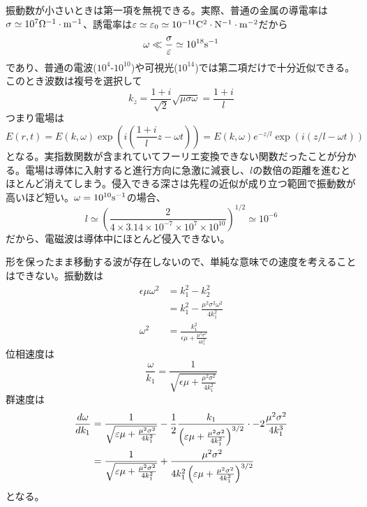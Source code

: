     振動数が小さいときは第一項を無視できる。実際、普通の金属の導電率は$\sigma \simeq 10^7 {\rm \Omega^{-1} \cdot m^{-1}}$、誘電率は$\epsilon \simeq \epsilon_0 \simeq 10^{-11}{\rm C^2 \cdot N^{-1} \cdot m^{-2}}$だから
        \[\omega \ll \frac{\sigma}{\epsilon} \simeq 10^{18}{\rm s^{-1}}\]
    であり、普通の電波($10^4$-$10^{10}$)や可視光($10^{14}$)では第二項だけで十分近似できる。このとき波数は複号を選択して
        \[k_z = \frac{1 + i}{\sqrt{2}}\sqrt{\mu\sigma\omega} = \frac{1 + i}{l}\]
    つまり電場は
        \[E(r, t) = E(k, \omega)\exp\left(i\left(\frac{1 + i}{l}z - \omega t\right)\right) = E(k, \omega)e^{-z/l}\exp(i(z/l - \omega t))\]
    となる。実指数関数が含まれていてフーリエ変換できない関数だったことが分かる。電場は導体に入射すると進行方向に急激に減衰し、$l$の数倍の距離を進むとほとんど消えてしまう。侵入できる深さは先程の近似が成り立つ範囲で振動数が高いほど短い。$\omega = 10^{10}{\rm s^{-1}}$の場合、
        \[l \simeq \left(\frac{2}{4\times 3.14\times 10^{-7}\times 10^7\times 10^{10}}\right)^{1/2} \simeq 10^{-6}\]
    だから、電磁波は導体中にほとんど侵入できない。

    形を保ったまま移動する波が存在しないので、単純な意味での速度を考えることはできない。振動数は
    \begin{align*}
        \epsilon\mu\omega^2
        &= k_1^2 - k_2^2\\
        &= k_1^2 - \frac{\mu^2\sigma^2\omega^2}{4k_1^2}\\
        \omega^2
        &= \frac{k_1^2}{\epsilon\mu + \frac{\mu^2\sigma^2}{4k_1^2}}
    \end{align*}
    位相速度は
        \[\frac{\omega}{k_1} = \frac{1}{\sqrt{\epsilon\mu + \frac{\mu^2\sigma^2}{4k_1^2}}}\]
    群速度は
    \begin{align*}
        \de[\omega]{k_1}
        &= \frac{1}{\sqrt{\epsilon\mu + \frac{\mu^2\sigma^2}{4k_1^2}}} - \frac{1}{2}\frac{k_1}{\left(\epsilon\mu + \frac{\mu^2\sigma^2}{4k_1^2}\right)^{3/2}} \cdot -2 \frac{\mu^2\sigma^2}{4k_1^3}\\
        &= \frac{1}{\sqrt{\epsilon\mu + \frac{\mu^2\sigma^2}{4k_1^2}}} + \frac{\mu^2\sigma^2}{4k_1^2\left(\epsilon\mu + \frac{\mu^2\sigma^2}{4k_1^2}\right)^{3/2}}
    \end{align*}
    となる。

